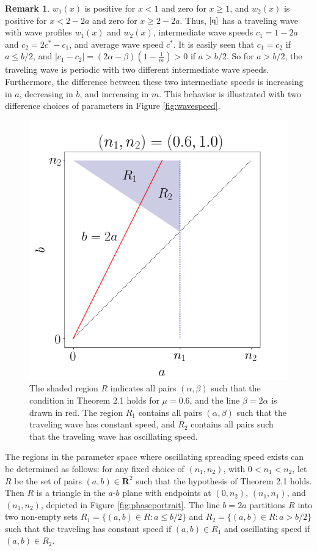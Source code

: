 \documentclass[11pt]{article}
\theoremstyle{definition}
\newtheorem{rem}[thm]{Remark}
\numberwithin{equation}{section}
\numberwithin{thm}{section}
\renewcommand{\a}{\alpha}
\renewcommand{\b}{\beta}
\newcommand{\m}{\mu}
\begin{document}
\begin{rem}
$w_1(x)$ is positive for $x<1$ and zero for $x\geq1$, and $w_2(x)$ is positive for $x<2-2a$ and zero for $x\geq 2-2a$. Thus, $\eqref{q}$ has a traveling wave with wave profiles $w_1(x)$ and $w_2(x)$, intermediate wave speeds $c_1=1-2a$ and $c_2=2c^*-c_1$,  and average wave speed  $c^*$.  It is easily seen that $c_1=c_2$ if $a \leq b/2$, and $|c_1-c_2|=(2\alpha-\beta)(1-\frac{1}{m})>0$ if $a>b/2$. So for $a>b/2$, the traveling wave is periodic with two different intermediate wave speeds. Furthermore, the difference between these two intermediate speeds is increasing in $a$, decreasing in $b$, and increasing in $m$. This behavior is illustrated with two difference choices of parameters in Figure \ref{fig:wavespeed}.
\end{rem}


\begin{figure}[h!] 
\centering
  \caption{The shaded region $R$ indicates all pairs $(\a,\b)$ such that the condition in Theorem 2.1 holds for $\m=0.6$, and the line $\b=2\a$ is drawn in red. The region $R_1$ contains all pairs $(\a,\b)$ such that the traveling wave has constant speed, and $R_2$ contains all pairs such that the traveling wave has oscillating speed.}
\label{fig4}
  \includegraphics[width=.5\linewidth]{figures/fig4.png}
\end{figure}

The regions in the parameter space where oscillating spreading speed exists can be determined as follows: for any fixed choice of $(n_1,n_2)$, with $0<n_1<n_2$, let $R$ be the set of pairs $(a,b)\in\mathbf R^2$ such that the hypothesis of Theorem 2.1 holds. Then $R$ is a triangle in the $a$-$b$ plane with endpoints at $(0,n_2)$, $(n_1,n_1)$, and $(n_1,n_2)$, depicted in Figure \ref{fig:phaseportrait}. The line $b=2a$ partitions $R$ into two non-empty sets $R_1=\{(a,b)\in R:a\leq b/2\}$ and $R_2=\{(a,b)\in R:a> b/2\}$ such that the traveling has constant speed if $(a,b)\in R_1$ and oscillating speed if $(a,b)\in R_2$.
\end{document}
